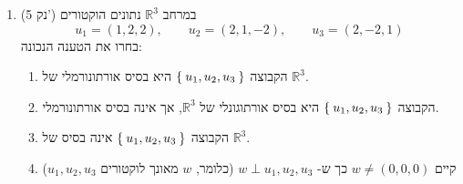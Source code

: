 \documentclass[12pt, a4paper]{article}
\newcommand{\rr}{\mathbb{R}}
\newcommand{\points}[1]{(#1 נק') }
\begin{document}
\begin{enumerate}
\begin{enumerate}
\item
המטריצה המייצגת של
$T$
ביחס לבסיס הסטנדרטי
$\Set{\begin{pmatrix}
    1 \\ 0
\end{pmatrix},
\begin{pmatrix}
    0 \\ 1
\end{pmatrix}
}$
היא
$\begin{pmatrix}
2&1\\
1&-1
\end{pmatrix}$

\item
מתקיים
$T(2,0)=(2,2)$.

\item
ההעתקה
$T$
אינה הפיכה.
\end{enumerate}
\noindent\rule{\textwidth-30pt}{0.4pt}

\item\points{5}
במרחב
$\rr^3$
נתונים הוקטורים
$$u_1=(1,2,2),\qquad u_2=(2,1,-2),\qquad u_3=(2,-2,1)$$
בחרו את הטענה הנכונה:
\begin{enumerate}
\item
הקבוצה
$\Set{u_1,u_2,u_3}$
היא בסיס אורתונורמלי של
$\rr^3$.

\item[\fbox{\textcircled{ב}}]
הקבוצה
$\Set{u_1,u_2,u_3}$
היא בסיס אורתוגונלי של
$\rr^3$,
אך אינה בסיס אורתונורמלי.

\item
הקבוצה
$\Set{u_1,u_2,u_3}$
אינה בסיס של
$\rr^3$.

\item
קיים
$w\neq (0,0,0)$
כך ש-
$w\perp u_1,u_2,u_3$ (כלומר,
$w$
מאונך לוקטורים
$u_1,u_2,u_3$)
\end{enumerate}

\pagebreak


\end{enumerate}
\end{document}
